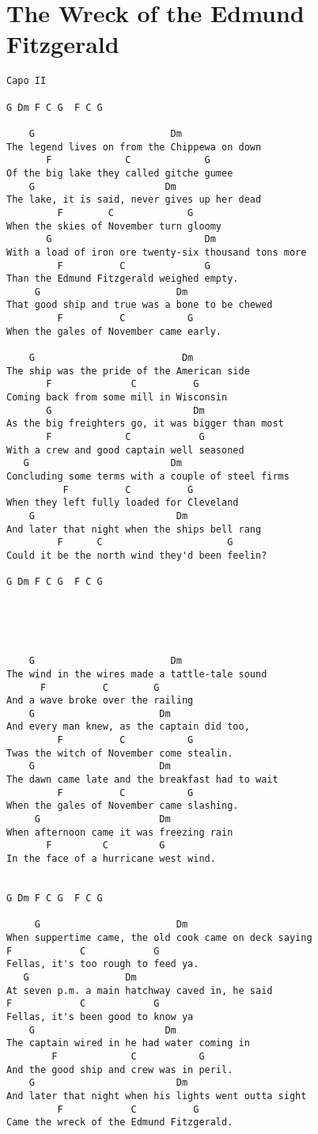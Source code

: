 \documentclass[leqno]{memoir}
\begin{document}
\chapter{The Wreck of the Edmund Fitzgerald}
\begin{verbatim}
Capo II

G Dm F C G  F C G

    G                        Dm
The legend lives on from the Chippewa on down
       F             C             G
Of the big lake they called gitche gumee
    G                       Dm
The lake, it is said, never gives up her dead
         F        C             G
When the skies of November turn gloomy
       G                           Dm
With a load of iron ore twenty-six thousand tons more
         F          C              G
Than the Edmund Fitzgerald weighed empty.
     G                        Dm
That good ship and true was a bone to be chewed
         F          C           G
When the gales of November came early.

    G                          Dm
The ship was the pride of the American side
       F              C          G
Coming back from some mill in Wisconsin
       G                         Dm
As the big freighters go, it was bigger than most
       F             C            G
With a crew and good captain well seasoned
   G                         Dm
Concluding some terms with a couple of steel firms
          F          C          G
When they left fully loaded for Cleveland
    G                         Dm
And later that night when the ships bell rang
         F      C                      G
Could it be the north wind they'd been feelin? 

G Dm F C G  F C G





    G                        Dm
The wind in the wires made a tattle-tale sound
      F          C        G
And a wave broke over the railing
    G                      Dm
And every man knew, as the captain did too,
         F          C           G
Twas the witch of November come stealin.
    G                      Dm
The dawn came late and the breakfast had to wait
         F          C           G
When the gales of November came slashing.
     G                     Dm
When afternoon came it was freezing rain
       F         C         G
In the face of a hurricane west wind.


G Dm F C G  F C G

     G                        Dm
When suppertime came, the old cook came on deck saying
F            C            G
Fellas, it's too rough to feed ya.
   G                 Dm
At seven p.m. a main hatchway caved in, he said
F            C            G
Fellas, it's been good to know ya
    G                       Dm
The captain wired in he had water coming in
        F             C           G
And the good ship and crew was in peril.
    G                         Dm
And later that night when his lights went outta sight
         F            C          G
Came the wreck of the Edmund Fitzgerald.


\end{verbatim}
\end{document}
